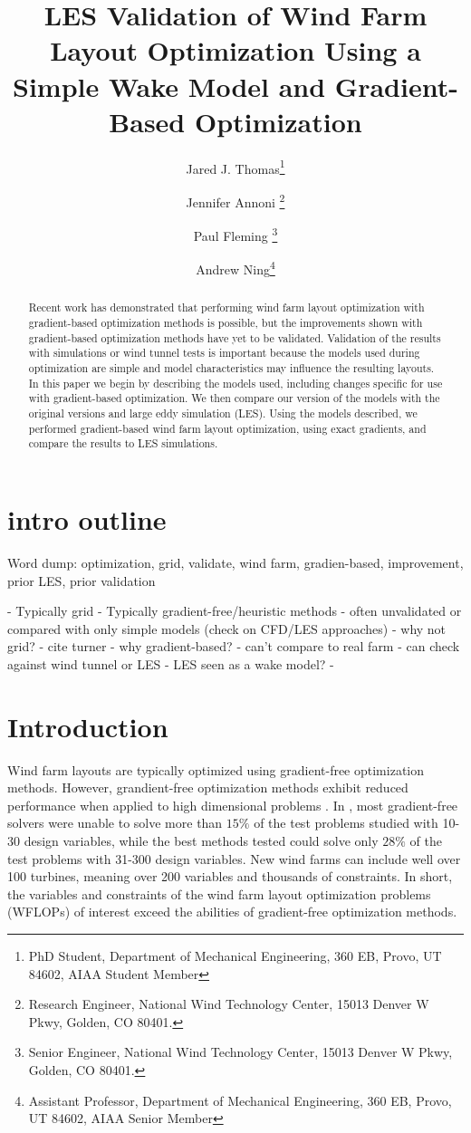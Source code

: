 \documentclass[conf]{new-aiaa}
\title{LES Validation of Wind Farm Layout Optimization Using a Simple Wake Model and Gradient-Based Optimization}
\author{Jared J. Thomas\footnote{PhD Student, Department of Mechanical Engineering, 360 EB, Provo, UT 84602, AIAA Student Member}}
\affil{Brigham Young University, Provo, UT 84602}
\author{Jennifer Annoni \footnote{Research Engineer, National Wind Technology Center, 15013 Denver W Pkwy, Golden, CO 80401.}}
\author{Paul Fleming \footnote{Senior Engineer, National Wind Technology Center, 15013 Denver W Pkwy, Golden, CO 80401.}}
\affil{National Renewable Energy Laboratory, Golden, CO, 80401, USA}
\author{Andrew Ning\footnote{Assistant Professor, Department of Mechanical Engineering, 360 EB, Provo, UT 84602, AIAA Senior Member}}
\affil{Brigham Young University, Provo, UT 84602}
\begin{document}
\maketitle

\begin{abstract}
Recent work has demonstrated that performing wind farm layout optimization with gradient-based optimization methods is possible, but the improvements shown with gradient-based optimization methods have yet to be validated. Validation of the results with simulations or wind tunnel tests is important because the models used during optimization are simple and model characteristics may influence the resulting layouts. In this paper we begin by describing the models used, including changes specific for use with gradient-based optimization. We then compare our version of the models with the original versions and large eddy simulation (LES). Using the models described, we performed gradient-based wind farm layout optimization, using exact gradients, and compare the results to LES simulations. 
\end{abstract}

\section*{intro outline}
Word dump:
optimization, grid, validate, wind farm, gradien-based, improvement, prior LES, prior validation

- Typically grid
- Typically gradient-free/heuristic methods
- often unvalidated or compared with only simple models (check on CFD/LES approaches)
- why not grid? - cite turner
- why gradient-based?
- can't compare to real farm
- can check against wind tunnel or LES
- LES seen as a wake model?
- 

\section{Introduction}

 Wind farm layouts are typically optimized using gradient-free optimization methods. However, grandient-free optimization methods exhibit reduced performance when applied to high dimensional problems \cite{rios2013-grad-free-comparison}. In \cite{rios2013-grad-free-comparison}, most gradient-free solvers were unable to solve more than $15\%$ of the test problems studied with 10-30 design variables, while the best methods tested could solve only $28\%$ of the test problems with 31-300 design variables. New wind farms can include well over 100 turbines, meaning over 200 variables and thousands of constraints. In short, the variables and constraints of the wind farm layout optimization problems (WFLOPs) of interest exceed the abilities of gradient-free optimization methods.
\end{document}
